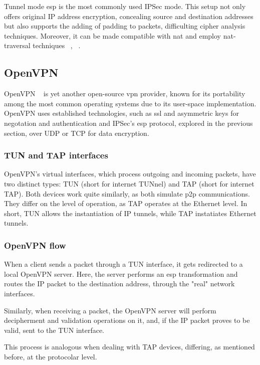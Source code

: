 \documentclass[11pt,twoside,a4paper]{report}
\begin{document}
Tunnel mode \acrshort{esp} is the most commonly used IPSec mode. This setup not only offers original IP address encryption, concealing source and destination addresses but also supports the adding of padding to packets, difficulting cipher analysis techniques. Moreover, it can be made compatible with \acrshort{nat} and employ \acrshort{nat}-traversal techniques ~\cite{nam2022high}, ~\cite{singh2012nat}.

\subsection{OpenVPN}

OpenVPN ~\cite{ovpnwebsite} is yet another open-source \acrshort{vpn} provider, known for its portability among the most common operating systems due to its user-space implementation. OpenVPN uses established technologies, such as \acrshort{ssl} and asymmetric keys for negotation and authentication and IPSec's \acrshort{esp} protocol, explored in the previous section, over UDP or TCP for data encryption.

\subsubsection{TUN and TAP interfaces}

OpenVPN's virtual interfaces, which process outgoing and incoming packets, have two distinct types: TUN (short for internet TUNnel) and TAP (short for internet TAP). Both devices work quite similarly, as both simulate \acrshort{p2p} communications. They differ on the level of operation, as TAP operates at the Ethernet level. In short, TUN allows the instantiation of IP tunnels, while TAP instatiates Ethernet tunnels.

\subsubsection{OpenVPN flow}

When a client sends a packet through a TUN interface, it gets redirected to a local OpenVPN server. Here, the server performs an \acrshort{esp} transformation and routes the IP packet to the destination address, through the "real" network interfaces.

Similarly, when receiving a packet, the OpenVPN server will perform decipherment and validation operations on it, and, if the IP packet proves to be valid, sent to the TUN interface.

This process is analogous when dealing with TAP devices, differing, as mentioned before, at the protocolar level.
\end{document}
